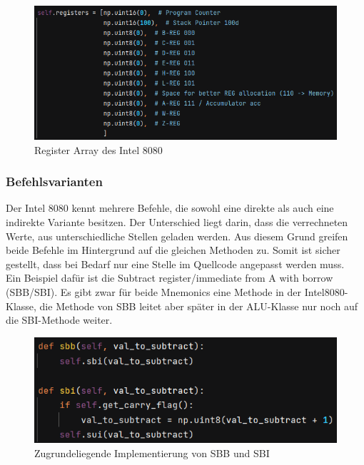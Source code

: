 \documentclass[12pt]{article}
\newcommand{\imgSpaceBefore}{\vspace{10pt}}
\begin{document}
\imgSpaceBefore
\begin{figure}[H]
\centering
\includegraphics[width=15cm]{Bilder/register_array}
\caption{Register Array des Intel 8080}
\label{fig:reg_array}
\end{figure}

\newpage


\subsubsection{Befehlsvarianten}

Der Intel 8080 kennt mehrere Befehle, die sowohl eine direkte als auch eine indirekte Variante besitzen. Der Unterschied liegt darin, dass die verrechneten Werte, aus unterschiedliche Stellen geladen werden. Aus diesem Grund greifen beide Befehle im Hintergrund auf die gleichen Methoden zu. Somit ist sicher gestellt, dass bei Bedarf nur eine Stelle im Quellcode angepasst werden muss.
\\
Ein Beispiel dafür ist die \glqq Subtract register/immediate from A with borrow (SBB/SBI)\grqq. Es gibt zwar für beide Mnemonics eine Methode in der Intel8080-Klasse, die Methode von SBB leitet aber später in der ALU-Klasse nur noch auf die SBI-Methode weiter.

\imgSpaceBefore
\begin{figure}[h]
\centering
\includegraphics[width=15cm]{Bilder/DoubleUsedMethodSubtract}
\caption{Zugrundeliegende Implementierung von SBB und SBI}
\label{fig:DoubleUsedMethodSubtract}
\end{figure}
\end{document}
